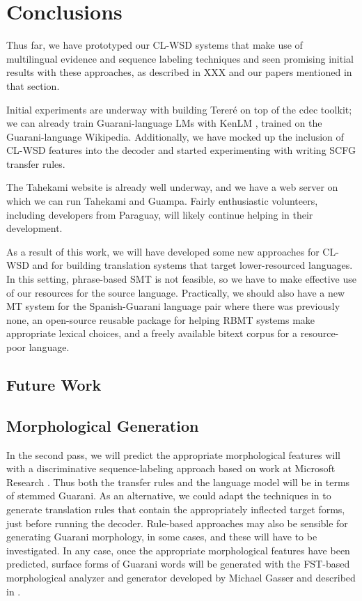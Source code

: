 \chapter{Conclusions}
\label{chap:conclusions}
Thus far, we have prototyped our CL-WSD systems that make use of multilingual
evidence and sequence labeling techniques and seen promising initial results
with these approaches, as described in XXX and our papers
mentioned in that section.

Initial experiments are underway with building Tereré on top of the cdec
toolkit; we can already train Guarani-language LMs with KenLM
\cite{Heafield-estimate}, trained on the Guarani-language Wikipedia.
Additionally, we have mocked up the inclusion of CL-WSD features into the
decoder and started experimenting with writing SCFG transfer rules.

The Tahekami website is already well underway, and we have a web server on
which we can run Tahekami and Guampa. Fairly enthusiastic volunteers, including
developers from Paraguay, will likely continue helping in their development.

As a result of this work, we will have developed some new approaches for
CL-WSD and for building translation systems that target lower-resourced
languages. In this setting, phrase-based SMT is not feasible, so we have to
make effective use of our resources for the source language.
Practically, we should also have a new MT system for the Spanish-Guarani
language pair where there was previously none, an open-source reusable
package for helping RBMT systems make appropriate lexical choices, and a freely
available bitext corpus for a resource-poor language.

\section{Future Work}

\section{Morphological Generation}
In the second pass, we will predict the appropriate morphological features will
with a discriminative sequence-labeling approach based on work at Microsoft
Research \cite{toutanova-suzuki-ruopp:2008:ACLMain}.
Thus both the transfer rules and the language model will be in terms of stemmed
Guarani.
As an alternative, we could adapt the techniques in
\cite{chahuneau:2013:emnlp} to generate translation rules that contain the
appropriately inflected target forms, just before running the decoder.
Rule-based approaches may also be sensible for generating Guarani morphology,
in some cases, and these will have to be investigated. In any case, once the
appropriate morphological features have been predicted, surface forms of
Guarani words will be generated with the FST-based morphological analyzer and
generator developed by Michael Gasser and described in
\cite{rudnick-gasser:2013:HyTra}.

